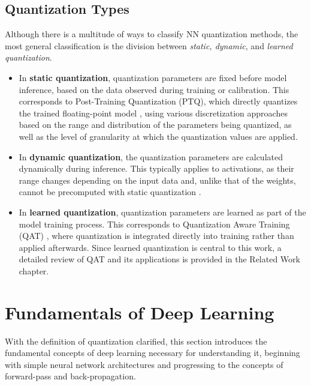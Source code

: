 \subsection{Quantization Types}
\label{subsec:subsection2}

Although there is a multitude of ways to classify NN quantization methods, the most general classification is the division between \textit{static, dynamic}, and \textit{learned quantization}.
    \begin{itemize}
        \item In \textbf{static quantization}, quantization parameters are fixed before model inference, based on the data observed during training or calibration.
        This corresponds to Post-Training Quantization (PTQ), which directly quantizes the trained floating-point model \cite{jiang2021efficient}, 
        using various discretization approaches based on the range and distribution of the parameters being quantized, 
        as well as the level of granularity at which the quantization values are applied.
        
        \item In \textbf{dynamic quantization}, the quantization parameters are calculated dynamically during inference. 
        This typically applies to activations, as their range changes depending on the input data and, unlike that of the weights, 
        cannot be precomputed with static quantization \cite{kim2021ibert}.
        
        \item In \textbf{learned quantization}, quantization parameters are learned as part of the model training process.
        This corresponds to Quantization Aware Training (QAT) \cite{jacob2018quantization}, where quantization is integrated directly into training rather than applied afterwards.
        Since learned quantization is central to this work, a detailed review of QAT and its applications is provided in the Related Work chapter. 

    \end{itemize}

\section{Fundamentals of Deep Learning}
\label{sec:section2}
With the definition of quantization clarified, this section introduces the fundamental concepts of deep learning necessary for understanding it, 
beginning with simple neural network architectures and progressing to the concepts of forward-pass and back-propagation.


